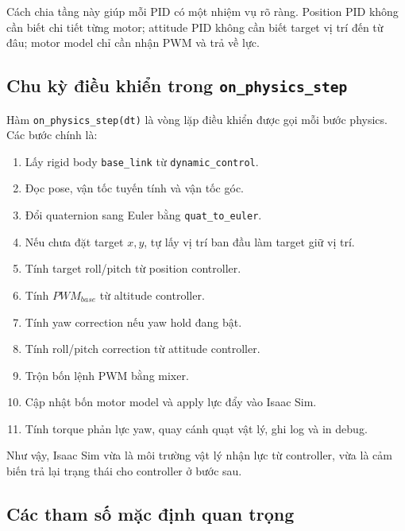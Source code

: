 Cách chia tầng này giúp mỗi PID có một nhiệm vụ rõ ràng. Position PID không cần
biết chi tiết từng motor; attitude PID không cần biết target vị trí đến từ đâu;
motor model chỉ cần nhận PWM và trả về lực.

\subsection{Chu kỳ điều khiển trong \texttt{on\_physics\_step}}

Hàm \texttt{on\_physics\_step(dt)} là vòng lặp điều khiển được gọi mỗi bước
physics. Các bước chính là:

\begin{enumerate}
    \item Lấy rigid body \texttt{base\_link} từ \texttt{dynamic\_control}.
    \item Đọc pose, vận tốc tuyến tính và vận tốc góc.
    \item Đổi quaternion sang Euler bằng \texttt{quat\_to\_euler}.
    \item Nếu chưa đặt target $x,y$, tự lấy vị trí ban đầu làm target giữ vị
    trí.
    \item Tính target roll/pitch từ position controller.
    \item Tính $PWM_{base}$ từ altitude controller.
    \item Tính yaw correction nếu yaw hold đang bật.
    \item Tính roll/pitch correction từ attitude controller.
    \item Trộn bốn lệnh PWM bằng mixer.
    \item Cập nhật bốn motor model và apply lực đẩy vào Isaac Sim.
    \item Tính torque phản lực yaw, quay cánh quạt vật lý, ghi log và in debug.
\end{enumerate}

Như vậy, Isaac Sim vừa là môi trường vật lý nhận lực từ controller, vừa là cảm
biến trả lại trạng thái cho controller ở bước sau.

\subsection{Các tham số mặc định quan trọng}

